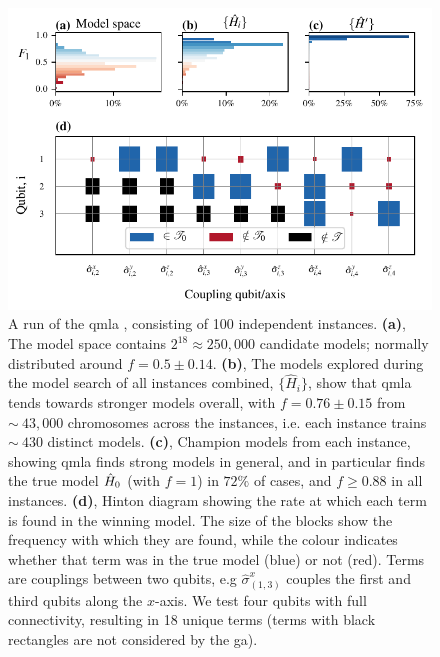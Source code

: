 \par 
\begin{figure}
    \begin{center}
        \includegraphics{theoretical_study/figures/gen_alg_run.pdf}
    \end{center}
    \caption[\Gls{run} of \gls{qmla} .]{
        A \gls{run} of the \gls{qmla} , consisting of 100 independent \glspl{instance}.
        \textbf{(a)}, The model space contains $2^{18}\approx250,000$ candidate models; 
            normally distributed around $f=0.5 \pm 0.14$. 
        \textbf{(b)}, The models explored during the model search of all instances combined, 
            $\{\hat{H}_i\}$, show that \gls{qmla} tends towards stronger models overall, 
            with $f = 0.76 \pm 0.15$ from $\sim~43,000$ chromosomes across the instances, 
            i.e. each instance trains $\sim~430$ distinct models. 
        \textbf{(c)}, Champion models from each instance, showing \gls{qmla} finds strong models 
            in general, and in particular finds the true model $\hat{H}_0$ (with $f=1$) in $72\%$ of cases, 
            and $f \geq 0.88$ in all instances. 
        \textbf{(d)}, Hinton diagram showing the rate at which each term is found in the winning model. 
            The size of the blocks show the frequency with which they are found, while the colour indicates 
            whether that term was in the true model (blue) or not (red).
            Terms are couplings between two qubits, e.g $\hat{\sigma}_{(1, 3)}^{x}$ 
                couples the first and third qubits along the $x$-axis. 
            We test four qubits with full connectivity, resulting in 18 unique terms 
            (terms with black rectangles are not considered by the \gls{ga}).
}
    \label{fig:ga_run}
\end{figure}

